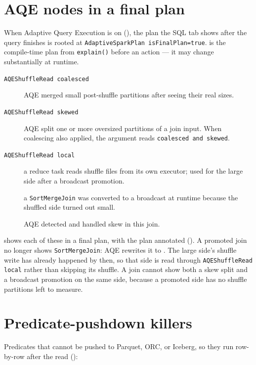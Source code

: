 \section{AQE nodes in a final plan}
\label{sec:c-aqe}

When Adaptive Query Execution is on (), the plan the SQL tab shows
after the query finishes is rooted at \texttt{AdaptiveSparkPlan
isFinalPlan=true}.  is the compile-time plan from
\texttt{explain()} before an action --- it may change substantially at runtime.

\begin{description}
  \item[\texttt{AQEShuffleRead coalesced}] AQE merged small post-shuffle
        partitions after seeing their real sizes.
  \item[\texttt{AQEShuffleRead skewed}] AQE split one or more oversized
        partitions of a join input. When coalescing also applied, the argument
        reads \texttt{coalesced and skewed}.
  \item[\texttt{AQEShuffleRead local}] a reduce task reads shuffle files from its
        own executor; used for the large side after a broadcast promotion.
  \item[] a \texttt{SortMergeJoin} was converted to a
        broadcast at runtime because the shuffled side turned out small.
  \item[] AQE detected and handled skew in
        this join.
\end{description}

 shows each of these in a final plan, with the plan annotated
(). A promoted join no longer shows
\texttt{SortMergeJoin}: AQE rewrites it to . The large
side's shuffle write has already happened by then, so that side is read
through \texttt{AQEShuffleRead local} rather than skipping its shuffle. A
join cannot show both a skew split and a broadcast promotion on the same side,
because a promoted side has no shuffle partitions left to measure.

\section{Predicate-pushdown killers}
\label{sec:c-pushdown}

Predicates that cannot be pushed to Parquet, ORC, or Iceberg, so they run
row-by-row after the read ():

